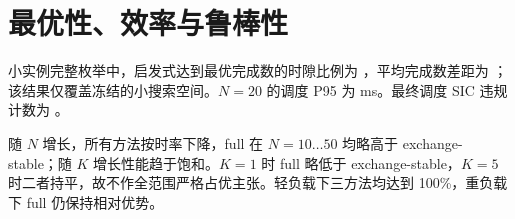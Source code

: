 \section{最优性、效率与鲁棒性}
小实例完整枚举中，启发式达到最优完成数的时隙比例为 \ExactOptimalPercent{}，平均完成数差距为 \ExactMeanCompletionGap{}；该结果仅覆盖冻结的小搜索空间。$N=20$ 的调度 P95 为 \FullRuntimePNinetyFiveMs{} ms。最终调度 SIC 违规计数为 \SICViolationCount{}。

随 $N$ 增长，所有方法按时率下降，full 在 $N=10\ldots50$ 均略高于 exchange-stable；随 $K$ 增长性能趋于饱和。$K=1$ 时 full 略低于 exchange-stable，$K=5$ 时二者持平，故不作全范围严格占优主张。轻负载下三方法均达到 100\%，重负载下 full 仍保持相对优势。

\begin{table}[htbp]
\centering
\caption{正式配对统计与主工程指标}
\resizebox{\textwidth}{!}{}
\end{table}
